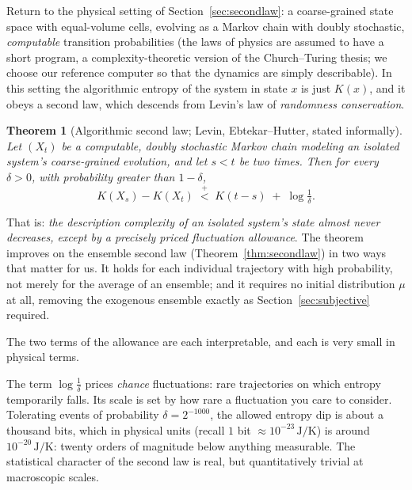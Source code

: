\documentclass[10pt]{article}
\newtheorem{theorem}{Theorem}[section]
\theoremstyle{definition}
\theoremstyle{remark}
\newcommand{\plt}{\mathrel{\stackrel{+}{<}}}
\begin{document}
Return to the physical setting of Section~\ref{sec:secondlaw}: a coarse-grained state space with equal-volume cells, evolving as a Markov chain with doubly stochastic, \emph{computable} transition probabilities (the laws of physics are assumed to have a short program, a complexity-theoretic version of the Church--Turing thesis; we choose our reference computer so that the dynamics are simply describable). In this setting the algorithmic entropy of the system in state $x$ is just $K(x)$, and it obeys a second law, which descends from Levin's law of \emph{randomness conservation}.

\begin{theorem}[Algorithmic second law; Levin, Ebtekar--Hutter, stated informally]
\label{thm:algsecond}
Let $(X_t)$ be a computable, doubly stochastic Markov chain modeling an isolated system's coarse-grained evolution, and let $s < t$ be two times. Then for every $\delta > 0$, with probability greater than $1 - \delta$,
\[
K(X_s) - K(X_t) \;\plt\; K(t - s) \;+\; \log \tfrac1\delta .
\]
\end{theorem}

That is: \emph{the description complexity of an isolated system's state almost never decreases, except by a precisely priced fluctuation allowance}. The theorem improves on the ensemble second law (Theorem~\ref{thm:secondlaw}) in two ways that matter for us. It holds for each individual trajectory with high probability, not merely for the average of an ensemble; and it requires no initial distribution $\mu$ at all, removing the exogenous ensemble exactly as Section~\ref{sec:subjective} required.

The two terms of the allowance are each interpretable, and each is very small in physical terms.

The term $\log\frac1\delta$ prices \emph{chance} fluctuations: rare trajectories on which entropy temporarily falls. Its scale is set by how rare a fluctuation you care to consider. Tolerating events of probability $\delta = 2^{-1000}$, the allowed entropy dip is about a thousand bits, which in physical units (recall $1$ bit $\approx 10^{-23}\,\mathrm{J/K}$) is around $10^{-20}\,\mathrm{J/K}$: twenty orders of magnitude below anything measurable. The statistical character of the second law is real, but quantitatively trivial at macroscopic scales.
\end{document}
